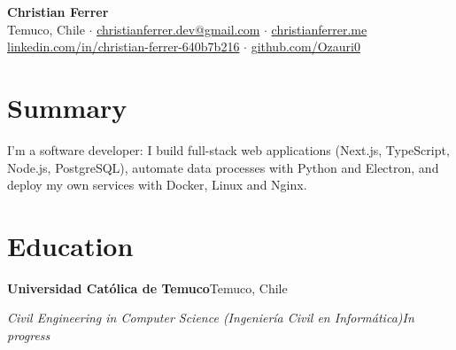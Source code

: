 \documentclass[10pt,letterpaper]{article}
\newcommand{\entry}[4]{%
  \textbf{#1}\hfill #2\par\nopagebreak
  \textit{#3}\hfill \textit{#4}\par\nopagebreak\vspace{0.05em}}
\begin{document}
\begin{center}
  {\LARGE\bfseries Christian Ferrer}\\[0.2em]
  Temuco, Chile $\cdot$ \href{mailto:christianferrer.dev@gmail.com}{christianferrer.dev@gmail.com} $\cdot$
  \href{https://christianferrer.me}{christianferrer.me}\\
  \href{https://www.linkedin.com/in/christian-ferrer-640b7b216/}{linkedin.com/in/christian-ferrer-640b7b216} $\cdot$
  \href{https://github.com/Ozauri0}{github.com/Ozauri0}
\end{center}

\section{Summary}
I'm a software developer: I build full-stack web applications (Next.js, TypeScript, Node.js, PostgreSQL), automate data processes with Python and Electron, and deploy my own services with Docker, Linux and Nginx.

\section{Education}
\entry{Universidad Católica de Temuco}{Temuco, Chile}{Civil Engineering in Computer Science (Ingeniería Civil en Informática)}{In progress}
\end{document}
